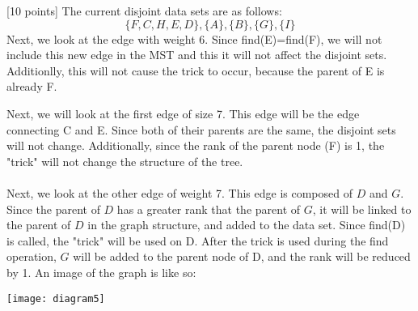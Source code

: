 \documentclass[12pt]{article}
\newcounter{ques}
\newenvironment{question}{\stepcounter{ques}{\noindent\bf Question \arabic{ques}:}}{\vspace{5mm}}
\begin{document}
\begin{question}[10 points]
The current disjoint data sets are as follows:
$$\{F,C,H,E,D\},\{A\},\{B\},\{G\},\{I\}$$
Next, we look at the edge with weight 6. Since find(E)=find(F), we will not include this new edge in the MST and this it will not affect the disjoint sets. Additionlly, this will not cause the trick to occur, because the parent of E is already F.

Next, we will look at the first edge of size 7. This edge will be the edge connecting C and E. Since both of their parents are the same, the disjoint sets will not change. Additionally, since the rank of the parent node (F) is 1, the "trick" will not change the structure of the tree.\\\\

Next, we look at the other edge of weight 7. This edge is composed of $D$ and $G$. Since the parent of $D$ has a greater rank that the parent of $G$, it will be linked to the parent of $D$ in the graph structure, and added to the data set. Since find(D) is called, the "trick" will be used on D. After the trick is used during the find operation, $G$ will be added to the parent node of D, and the rank will be reduced by 1. An image of the graph is like so:
\begin{center}
\texttt{[image: diagram5]}
\end{center}


\end{question}
\end{document}
